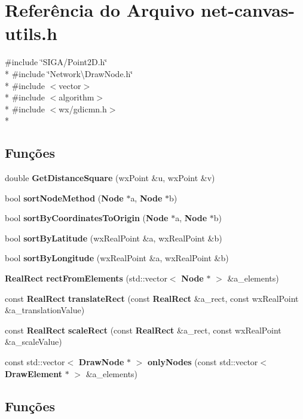 \section{Referência do Arquivo net-\/canvas-\/utils.h}
\label{net-canvas-utils_8h}
{\ttfamily \#include \char`\"{}S\+I\+G\+A/\+Point2\+D.\+h\char`\"{}}\\*
{\ttfamily \#include \char`\"{}Network\textbackslash{}\+Draw\+Node.\+h\char`\"{}}\\*
{\ttfamily \#include $<$vector$>$}\\*
{\ttfamily \#include $<$algorithm$>$}\\*
{\ttfamily \#include $<$wx/gdicmn.\+h$>$}\\*
\subsection*{Funções}
\begin{DoxyCompactItemize}
\item 
double {\bf Get\+Distance\+Square} (wx\+Point \&u, wx\+Point \&v)
\item 
bool {\bf sort\+Node\+Method} ({\bf Node} $\ast$a, {\bf Node} $\ast$b)
\item 
bool {\bf sort\+By\+Coordinates\+To\+Origin} ({\bf Node} $\ast$a, {\bf Node} $\ast$b)
\item 
bool {\bf sort\+By\+Latitude} (wx\+Real\+Point \&a, wx\+Real\+Point \&b)
\item 
bool {\bf sort\+By\+Longitude} (wx\+Real\+Point \&a, wx\+Real\+Point \&b)
\item 
{\bf Real\+Rect} {\bf rect\+From\+Elements} (std\+::vector$<$ {\bf Node} $\ast$ $>$ \&a\+\_\+elements)
\item 
const {\bf Real\+Rect} {\bf translate\+Rect} (const {\bf Real\+Rect} \&a\+\_\+rect, const wx\+Real\+Point \&a\+\_\+translation\+Value)
\item 
const {\bf Real\+Rect} {\bf scale\+Rect} (const {\bf Real\+Rect} \&a\+\_\+rect, const wx\+Real\+Point \&a\+\_\+scale\+Value)
\item 
const std\+::vector$<$ {\bf Draw\+Node} $\ast$ $>$ {\bf only\+Nodes} (const std\+::vector$<$ {\bf Draw\+Element} $\ast$ $>$ \&a\+\_\+elements)
\end{DoxyCompactItemize}


\subsection{Funções}
